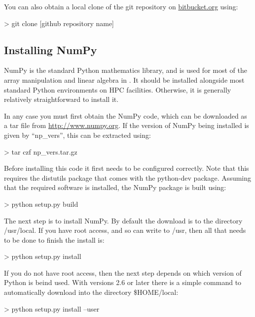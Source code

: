 \documentclass[11pt,english,fleqn]{report}
\newenvironment{code}{%
\footnotesize 
\verbatim
}{
\endverbatim
\normalsize
}
\begin{document}

You can also obtain a local clone of the git repository on \url{bitbucket.org}
using:

\begin{code}
> git clone [github repository name]
\end{code}


\subsection{Installing NumPy}

NumPy is the standard Python mathematics library, and is used for
most of the array manipulation and linear algebra in \ipi. It should
be installed alongside most standard Python environments on HPC facilities.
Otherwise, it is generally relatively straightforward to install it. 

In any case you must first obtain the NumPy code, which can be downloaded
as a tar file from \url{http://www.numpy.org}. If the version of
NumPy being installed is given by {}``np\_vers'', this can be extracted
using:

\begin{code}
> tar czf np_vers.tar.gz
\end{code}

Before installing this code it first needs to be configured correctly.
Note that this requires the distutils package that comes with the
python-dev package. Assuming that the required software is installed,
the NumPy package is built using:

\begin{code}
> python setup.py build
\end{code}

The next step is to install NumPy. By default the download is to the
directory /usr/local. If you have root access, and so can write to
/usr, then all that needs to be done to finish the install is:

\begin{code}
> python setup.py install
\end{code}

If you do not have root access, then the next step depends on which
version of Python is beind used. With versions 2.6 or later there
is a simple command to automatically download into the directory \$HOME/local:

\begin{code}
> python setup.py install --user
\end{code}
\end{document}
